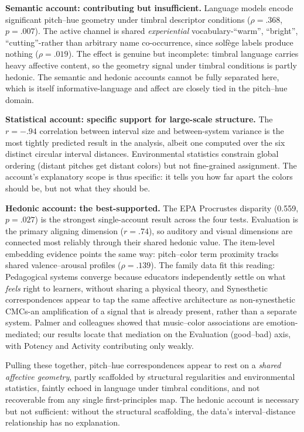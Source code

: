 \documentclass[12pt]{article}
\begin{document}
\textbf{Semantic account: contributing but insufficient.} Language
models encode significant pitch--hue geometry under timbral descriptor
conditions ($\rho = .368$, $p = .007$). The active channel is shared
\emph{experiential} vocabulary-``warm'', ``bright'', ``cutting''-rather
than arbitrary name co-occurrence, since solfège labels produce nothing
($\rho = .019$). The effect is genuine but incomplete: timbral language
carries heavy affective content, so the geometry signal under timbral
conditions is partly hedonic. The semantic and hedonic accounts cannot
be fully separated here, which is itself informative-language and
affect are closely tied in the pitch--hue domain.

\textbf{Statistical account: specific support for large-scale
structure.} The $r = -.94$ correlation between interval size and
between-system variance is the most tightly predicted result in the
analysis, albeit one computed over the six distinct circular interval
distances. Environmental statistics constrain global ordering (distant pitches get
distant colors) but not fine-grained assignment. The account's
explanatory scope is thus specific: it tells you how far apart the
colors should be, but not what they should be.

\textbf{Hedonic account: the best-supported.} The EPA Procrustes
disparity (0.559, $p = .027$) is the strongest single-account result
across the four
tests. Evaluation is the primary aligning dimension ($r = .74$), so
auditory and visual dimensions
are connected most reliably through their shared hedonic value. The
item-level embedding evidence points the same way: pitch--color term
proximity tracks shared valence--arousal profiles ($\rho = .139$). The
family
data fit this reading: Pedagogical systems converge because educators
independently settle on what \emph{feels} right to learners, without
sharing a physical theory, and Synesthetic correspondences appear to tap
the same affective architecture as non-synesthetic CMCs-an
amplification of a signal that is already present, rather than a
separate system. Palmer and colleagues \citep{palmer2013} showed that
music--color associations are emotion-mediated; our results locate
that mediation on the Evaluation (good--bad) axis, with Potency and
Activity contributing only weakly.

Pulling these together, pitch--hue correspondences appear to rest on a
\emph{shared affective geometry}, partly scaffolded by structural
regularities and environmental statistics, faintly echoed in language
under timbral conditions, and not recoverable from any single
first-principles map. The hedonic account is necessary but not
sufficient: without the structural scaffolding, the data's
interval--distance relationship has no explanation.
\end{document}
